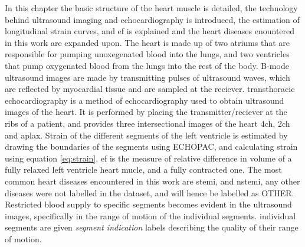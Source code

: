 In this chapter the basic structure of the heart muscle is detailed, the technology behind ultrasound imaging and echocardiography is introduced, the estimation of longitudinal strain curves, and \acrshort{ef} is explained and the heart diseases enountered in this work are expanded upon. The heart is made up of two atriums that are responsible for pumping unoxegenated blood into the lungs, and two ventricles that pump oxygenated blood from the lungs into the rest of the body. B-mode ultrasound images are made by transmitting pulses of ultrasound waves, which are reflected by myocardial tissue and are sampled at the reciever. transthoracic echocardiography is a method of echocardiography used to obtain ultrasound images of the heart. It is performed by placing the transmitter/reciever at the ribs of a patient, and provides three intersectional images of the heart \acrshort{4ch}, \acrshort{2ch} and \acrshort{aplax}. Strain of the different segments of the left ventricle is estimated by drawing the boundaries of the segments using ECHOPAC, and calculating strain using equation \eqref{eq:strain}. \acrshort{ef} is the measure of relative difference in volume of a fully relaxed left ventricle heart mucle, and a fully contracted one. The most common heart diseases encountered in this work are \acrshort{stemi}, and \acrshort{nstemi}, any other diseases were not labelled in the dataset, and will hence be labelled as OTHER. Restricted blood supply to specific segments becomes evident in the ultrasound images, specifically in the range of motion of the individual segments. individual segments are given \textit{segment indication} labels describing the quality of their range of motion. 